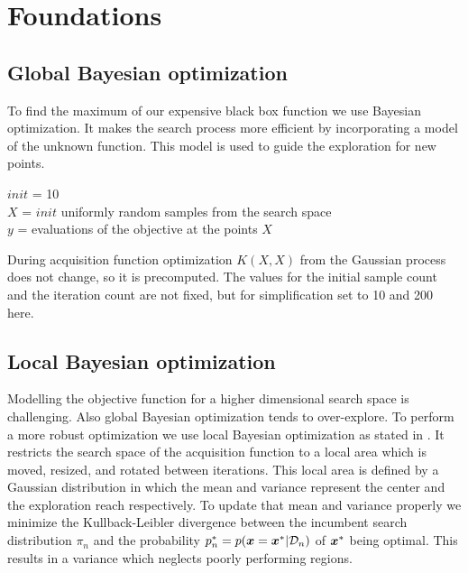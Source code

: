\chapter{Foundations}
\label{chap:2}

\section{Global Bayesian optimization}

To find the maximum of our expensive black box function we use Bayesian optimization. It makes the search process more efficient by incorporating a model of the unknown function. This model is used to guide the exploration for new points.

\begin{algorithm}
    $init$ = 10\\
    $X$ = $init$ uniformly random samples from the search space\\
    $y$ = evaluations of the objective at the points $X$\\
\end{algorithm}

During acquisition function optimization $K(X,X)$ from the Gaussian process does not change, so it is precomputed. The values for the initial sample count and the iteration count are not fixed, but for simplification set to 10 and 200 here.

\section{Local Bayesian optimization}

Modelling the objective function for a higher dimensional search space is challenging. Also global Bayesian optimization tends to over-explore. To perform a more robust optimization we use local Bayesian optimization as stated in \cite{akrour2017local}. It restricts the search space of the acquisition function to a local area which is moved, resized, and rotated between iterations. This local area is defined by a Gaussian distribution in which the mean and variance represent the center and the exploration reach respectively. To update that mean and variance properly we minimize the Kullback-Leibler divergence between the incumbent search distribution $\pi_n$ and the probability $p_n^* = p({\boldsymbol{x}}={\boldsymbol{x}}^*|\mathcal{D}_n)$ of ${\boldsymbol{x}}^*$ being optimal. This results in a variance which neglects poorly performing regions.

